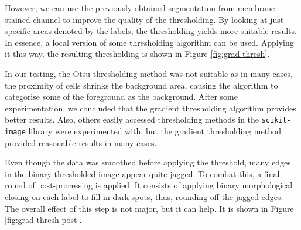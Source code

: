 \documentclass[
  digital,     %
  oneside,     %
  nosansbold,  %
  nocolorbold, %
  lof,         %
  lot,         %
]{fithesis4}
\begin{document}
However, we can use the previously obtained segmentation from membrane-stained
channel to improve the quality of the thresholding. By looking at just specific
areas denoted by the labels, the thresholding yields more suitable results. In
essence, a local version of some thresholding algorithm can be used. Applying it
this way, the resulting thresholding is shown in Figure \ref{fig:grad-thresh}.

In our testing, the Otsu thresholding method was not suitable as in many cases, the
proximity of cells shrinks the background area, causing the algorithm to
categorise some of the foreground as the background. After some experimentation,
we concluded that the gradient thresholding algorithm provides better results.
Also, others easily accessed thresholding methods in the \texttt{scikit-image}
library were experimented with, but the gradient thresholding method provided
reasonable results in many cases.

Even though the data was smoothed before applying the threshold, many edges in
the binary thresholded image appear quite jagged. To combat this, a final round
of post-processing is applied. It consists of applying binary morphological
closing on each label to fill in dark spots, thus, rounding off the jagged edges.
The overall effect of this step is not major, but it can help. It is shown in
Figure \ref{fig:grad-thresh-post}.
\end{document}
